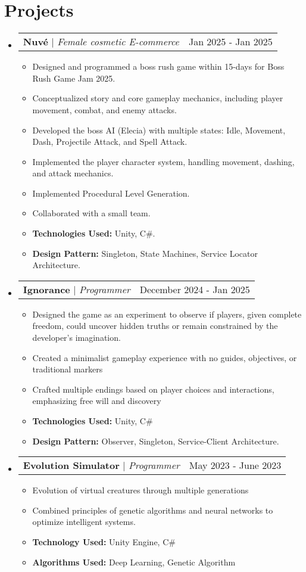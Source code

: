 \documentclass[letterpaper,11pt]{article}
\makeatletter
\newcommand{\resumeItem}[1]{
  \item\small{
    {#1 \vspace{-2pt}}
  }
}
\newcommand{\resumeProjectHeading}[2]{
    \item
    \begin{tabular*}{0.97\textwidth}{l@{\extracolsep{\fill}}r}
      \small#1 & #2 \\
    \end{tabular*}\vspace{-7pt}
}
\newcommand{\resumeSubHeadingListStart}{\begin{itemize}[leftmargin=0.15in, label={}]}
\newcommand{\resumeSubHeadingListEnd}{\end{itemize}}
\newcommand{\resumeItemListStart}{\begin{itemize}}
\newcommand{\resumeItemListEnd}{\end{itemize}\vspace{-5pt}}
\makeatother
\begin{document}
\section{Projects}
    \resumeSubHeadingListStart
    \resumeProjectHeading
          {\textbf{Nuvé} $|$ \emph{Female cosmetic E-commerce}}{Jan 2025 - Jan 2025}
          \resumeItemListStart
            \resumeItem{Designed and programmed a boss rush game within 15-days for Boss Rush Game Jam 2025.}
            \resumeItem{Conceptualized story and core gameplay mechanics, including player movement, combat, and enemy attacks.}
             \resumeItem{Developed the boss AI (Elecia) with multiple states: Idle, Movement, Dash, Projectile Attack, and Spell Attack.}
             \resumeItem{Implemented the player character system, handling movement, dashing, and attack mechanics.}
            \resumeItem{Implemented Procedural Level Generation.}
            \resumeItem{Collaborated with a small team.}
            \resumeItem{\textbf{Technologies Used:} Unity, C\#.}
            \resumeItem{\textbf{Design Pattern:} Singleton, State Machines, Service Locator Architecture.}
            \resumeItemListEnd
    \resumeProjectHeading
          {\textbf{Ignorance} $|$ \emph{Programmer}}{December 2024 - Jan 2025}
          \resumeItemListStart
            \resumeItem{Designed the game as an experiment to observe if players, given complete freedom, could uncover hidden truths or remain constrained by the developer’s imagination.}
             \resumeItem{Created a minimalist gameplay experience with no guides, objectives, or traditional markers}
             \resumeItem{Crafted multiple endings based on player choices and interactions, emphasizing free will and discovery}
             \resumeItem{\textbf{Technologies Used:} Unity, C\#}
             \resumeItem{\textbf{Design Pattern:} Observer, Singleton, Service-Client Architecture.}
            \resumeItemListEnd
      \resumeProjectHeading
          {\textbf{Evolution Simulator } $|$ \emph{Programmer}}{May 2023 - June 2023}
          \resumeItemListStart
            \resumeItem{Evolution of virtual creatures through multiple generations}
            \resumeItem{Combined principles of genetic algorithms and neural networks to optimize intelligent systems.}
            \resumeItem{\textbf{Technology Used:} Unity Engine, C\#}
            \resumeItem{\textbf{Algorithms Used:} Deep Learning, Genetic Algorithm}
            \resumeItemListEnd
      \resumeSubHeadingListEnd
\end{document}
